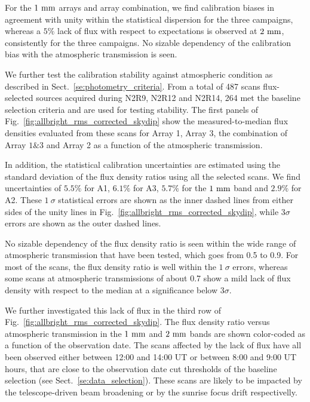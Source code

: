 For the $1~\rm{mm}$ arrays and array combination, we find calibration
biases in agreement with unity within the statistical dispersion for
the three campaigns, whereas a $5\%$ lack of flux with respect to
expectations is observed at $2~\rm{mm}$, consistently for the three
campaigns. No sizable dependency of the calibration bias with the
atmospheric transmission is seen.

We further test the calibration
stability against atmospheric condition as described in
Sect.~\ref{se:photometry_criteria}. From a total of 487 scans
flux-selected sources acquired during N2R9, N2R12 and N2R14, 264 met
the baseline selection criteria and are used for testing stability.
The first panels of Fig.~\ref{fig:allbright_rms_corrected_skydip} show the
measured-to-median flux densities evaluated from these scans for Array
1, Array 3, the combination of Array $1\&3$ and Array 2 as a function of the
atmospheric transmission.

In addition, the statistical calibration uncertainties are
estimated using the standard deviation of the flux density ratios
using all the selected scans. We find uncertainties of $5.5\%$ for A1,
$6.1\%$ for A3, $5.7\%$ for the $1~\rm{mm}$ band and $2.9\%$ for A2.
These $1~\sigma$ statistical
errors are shown as the inner dashed lines from either sides of the
unity lines in Fig.~\ref{fig:allbright_rms_corrected_skydip}, while
$3\sigma$ errors are shown as the outer dashed lines.

No sizable dependency of the flux density ratio is seen within the
wide range of atmospheric transmission that have been tested, which goes
from 0.5 to 0.9. For most of the scans,
the flux density ratio is well within the $1~\sigma$ errors, whereas
some scans at atmospheric transmissions of about 0.7 show a mild lack
of flux density with respect to the median at a significance below
$3\sigma$.

We further investigated this lack of flux in the third row of
Fig.~\ref{fig:allbright_rms_corrected_skydip}. The flux density ratio
versus atmospheric transmission in the $1~\rm{mm}$ and $2~\rm{mm}$
bands are shown color-coded as a function of the observation date. The
scans affected by the lack of flux have all been observed 
either between 12:00 and 14:00 UT or between 8:00 and 9:00 UT hours,
that are close to the observation date cut thresholds of the baseline
selection (see Sect.~\ref{se:data_selection}). These scans are likely
to be impacted by the telescope-driven beam broadening or by the
sunrise focus drift respectivelly.

